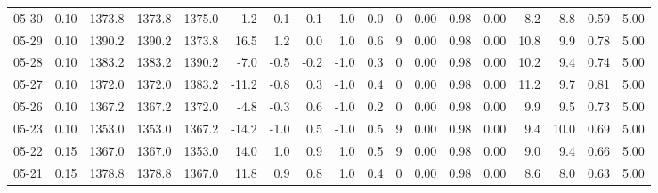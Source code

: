 \begin{threeparttable}
{\begin{tabular}{lrrrrrrrrrrrrrrrrr}
  05-30 &     0.10 & 1373.8 & 1373.8 & 1375.0 &       -1.2 &           -0.1 &                       0.1 &                     -1.0 &                 0.0 &              0 &       0.00 &      0.98 &           0.00 &              8.2 &                 8.8 &            0.59 &                   5.00 \\
  05-29 &     0.10 & 1390.2 & 1390.2 & 1373.8 &       16.5 &            1.2 &                       0.0 &                      1.0 &                 0.6 &              9 &       0.00 &      0.98 &           0.00 &             10.8 &                 9.9 &            0.78 &                   5.00 \\
  05-28 &     0.10 & 1383.2 & 1383.2 & 1390.2 &       -7.0 &           -0.5 &                      -0.2 &                     -1.0 &                 0.3 &              0 &       0.00 &      0.98 &           0.00 &             10.2 &                 9.4 &            0.74 &                   5.00 \\
  05-27 &     0.10 & 1372.0 & 1372.0 & 1383.2 &      -11.2 &           -0.8 &                       0.3 &                     -1.0 &                 0.4 &              0 &       0.00 &      0.98 &           0.00 &             11.2 &                 9.7 &            0.81 &                   5.00 \\
  05-26 &     0.10 & 1367.2 & 1367.2 & 1372.0 &       -4.8 &           -0.3 &                       0.6 &                     -1.0 &                 0.2 &              0 &       0.00 &      0.98 &           0.00 &              9.9 &                 9.5 &            0.73 &                   5.00 \\
  05-23 &     0.10 & 1353.0 & 1353.0 & 1367.2 &      -14.2 &           -1.0 &                       0.5 &                     -1.0 &                 0.5 &              9 &       0.00 &      0.98 &           0.00 &              9.4 &                10.0 &            0.69 &                   5.00 \\
  05-22 &     0.15 & 1367.0 & 1367.0 & 1353.0 &       14.0 &            1.0 &                       0.9 &                      1.0 &                 0.5 &              9 &       0.00 &      0.98 &           0.00 &              9.0 &                 9.4 &            0.66 &                   5.00 \\
  05-21 &     0.15 & 1378.8 & 1378.8 & 1367.0 &       11.8 &            0.9 &                       0.8 &                      1.0 &                 0.4 &              0 &       0.00 &      0.98 &           0.00 &              8.6 &                 8.0 &            0.63 &                   5.00 \\

\end{tabular}}
\end{threeparttable}

